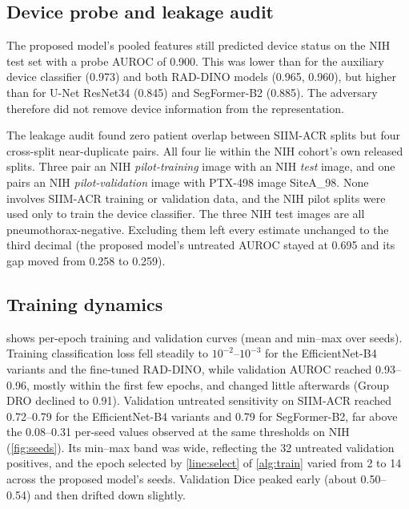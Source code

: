 \documentclass[final,3p]{elsarticle}
\begin{document}
\subsection{Device probe and leakage audit}
\label{sec:res-sanity}
The proposed model's pooled features still predicted device status on the NIH test set with a probe AUROC of 0.900. This was lower than for the auxiliary device classifier (0.973) and both RAD-DINO models (0.965, 0.960), but higher than for U-Net ResNet34 (0.845) and SegFormer-B2 (0.885). The adversary therefore did not remove device information from the representation.

The leakage audit found zero patient overlap between SIIM-ACR splits but four cross-split near-duplicate pairs. All four lie within the NIH cohort's own released splits. Three pair an NIH \emph{pilot-training} image with an NIH \emph{test} image, and one pairs an NIH \emph{pilot-validation} image with PTX-498 image SiteA\_98. None involves SIIM-ACR training or validation data, and the NIH pilot splits were used only to train the device classifier. The three NIH test images are all pneumothorax-negative. Excluding them left every estimate unchanged to the third decimal (the proposed model's untreated AUROC stayed at 0.695 and its gap moved from 0.258 to 0.259).

\subsection{Training dynamics}
\label{sec:res-conv}
 shows per-epoch training and validation curves (mean and min--max over seeds). Training classification loss fell steadily to $10^{-2}$--$10^{-3}$ for the EfficientNet-B4 variants and the fine-tuned RAD-DINO, while validation AUROC reached 0.93--0.96, mostly within the first few epochs, and changed little afterwards (Group DRO declined to 0.91). Validation untreated sensitivity on SIIM-ACR reached 0.72--0.79 for the EfficientNet-B4 variants and 0.79 for SegFormer-B2, far above the 0.08--0.31 per-seed values observed at the same thresholds on NIH (\cref{fig:seeds}). Its min--max band was wide, reflecting the 32 untreated validation positives, and the epoch selected by \cref{line:select} of \cref{alg:train} varied from 2 to 14 across the proposed model's seeds. Validation Dice peaked early (about 0.50--0.54) and then drifted down slightly.
\end{document}
